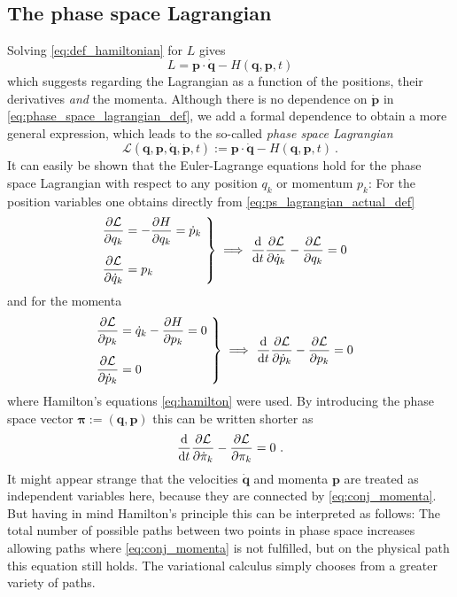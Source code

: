\documentclass{scrartcl}
\renewcommand{\vec}[1]{\boldsymbol{#1}}
\newcommand{\pid}{\dot{\pi}}
\newcommand{\lag}{L}
\newcommand{\ham}{H}
\newcommand{\PSL}{\mathcal{L}}
\begin{document}
\subsection{The phase space Lagrangian}\label{sec:phase_space_lagrangian}
Solving \eqref{eq:def_hamiltonian} for $\lag$ gives
\begin{equation}\label{eq:phase_space_lagrangian_def}
\lag = \vec{p}\cdot\dot{\vec{q}} - \ham(\vec{q},\vec{p},t)
\end{equation}
which suggests regarding the Lagrangian as a function of the positions, their derivatives \emph{and} the momenta. Although there is no dependence on $\dot{\vec{p}}$ in \eqref{eq:phase_space_lagrangian_def}, we add a formal dependence to obtain a more general expression, which leads to the so-called \emph{phase space Lagrangian}
\begin{equation}\label{eq:ps_lagrangian_actual_def}
\PSL(\vec{q},\vec{p},\dot{\vec{q}},\dot{\vec{p}},t) := \vec{p}\cdot\dot{\vec{q}} - \ham(\vec{q},\vec{p},t) \ . 
\end{equation}
It can easily be shown that the Euler-Lagrange equations hold for the phase space Lagrangian with respect to any position $q_k$ or momentum $p_k$: For the position variables one obtains directly from \eqref{eq:ps_lagrangian_actual_def}
\begin{align*}
\left.
\begin{matrix}
\dfrac{\partial\PSL}{\partial q_k} = -\dfrac{\partial \ham}{\partial q_k} = \dot{p}_k \hfill \\[5mm]
\dfrac{\partial\PSL}{\partial\dot{q}_k} = p_k \hfill \\
\end{matrix}
\ \right\rbrace\implies\ &\dv{t}\pdv{\PSL}{\dot{q}_k} - \pdv{\PSL}{q_k} = 0 
\end{align*}
and for the momenta
\begin{align*}
\left.
\begin{matrix}
\dfrac{\partial\PSL}{\partial p_k} = \dot{q}_k - \dfrac{\partial \ham}{\partial p_k} = 0 \hfill \\[5mm]
\dfrac{\partial\PSL}{\partial\dot{p}_k} = 0 \hfill \\
\end{matrix}
\ \right\rbrace\implies\ &\dv{t}\pdv{\PSL}{\dot{p}_k} - \pdv{\PSL}{p_k} = 0 
\end{align*}
where Hamilton's equations \eqref{eq:hamilton} were used. By introducing the phase space vector $\vec{\pi} := (\vec{q},\vec{p})$ this can be written shorter as
\begin{equation}\label{eq:eulerlagrange_phasespace}
\dv{t}\pdv{\PSL}{\pid_k} - \pdv{\PSL}{\pi_k} = 0 \ .
\end{equation}
It might appear strange that the velocities $\dot{\vec{q}}$ and momenta $\vec{p}$ are treated as independent variables here, because they are connected by \eqref{eq:conj_momenta}. But having in mind Hamilton's principle this can be interpreted as follows: The total number of possible paths between two points in phase space increases allowing paths where \eqref{eq:conj_momenta} is not fulfilled, but on the physical path this equation still holds. The variational calculus simply chooses from a greater variety of paths.
\end{document}
